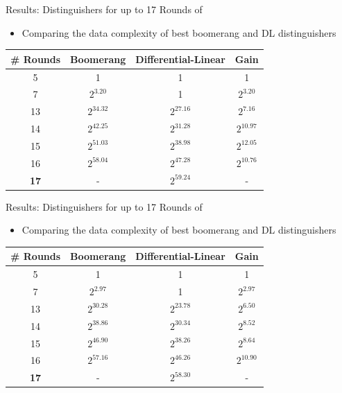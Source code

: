 \begin{frame}{Results: Distinguishers for up to 17 Rounds of }
  \begin{itemize}
    \item Comparing the data complexity of best boomerang and DL distinguishers
  \end{itemize}
  \begin{center}
  \begin{tabular}[t]{c|c|c|c}
  \toprule
  \# Rounds    &  Boomerang \cite{tosc_HadipourNE22} & Differential-Linear & Gain\\
  \midrule
  5            &  1            & 1           & 1\\
  7            &  $2^{3.20}$   & 1           & $2^{3.20}$\\
  13           &  $2^{34.32}$  & $2^{27.16}$ & $2^{7.16}$\\
  14           &  $2^{42.25}$  & $2^{31.28}$ & $2^{10.97}$\\
  15           &  $2^{51.03}$  & $2^{38.98}$ & $2^{12.05}$\\
  16           &  $2^{58.04}$  & $2^{47.28}$ & $2^{10.76}$\\
  \textbf{17}  &  -            & $2^{59.24}$ & - \\
  \bottomrule
  \end{tabular}
  \end{center}
  \end{frame}
\begin{frame}{Results: Distinguishers for up to 17 Rounds of }
\begin{itemize}
  \item Comparing the data complexity of best boomerang and DL distinguishers
\end{itemize}
\begin{center}
\begin{tabular}[t]{c|c|c|c}
\toprule
\# Rounds    &  Boomerang \cite{tosc_HadipourNE22} & Differential-Linear & Gain\\
\midrule
5            &  1            & 1           & 1\\
7            &  $2^{2.97}$   & 1           & $2^{2.97}$\\
13           &  $2^{30.28}$  & $2^{23.78}$ & $2^{6.50}$\\
14           &  $2^{38.86}$  & $2^{30.34}$ & $2^{8.52}$\\
15           &  $2^{46.90}$  & $2^{38.26}$ & $2^{8.64}$\\
16           &  $2^{57.16}$  & $2^{46.26}$ & $2^{10.90}$\\
\textbf{17}  &  -            & $2^{58.30}$ & - \\
\bottomrule
\end{tabular}
\end{center}
\end{frame}

